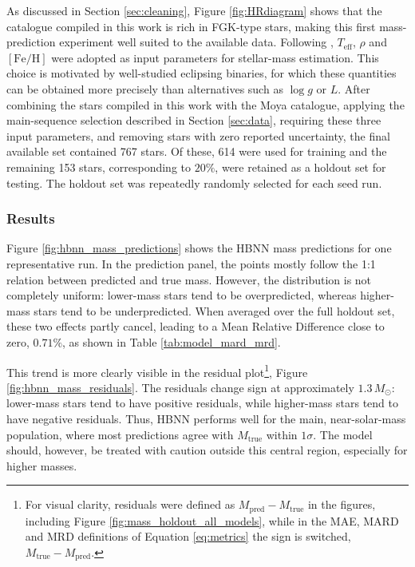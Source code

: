 As discussed in Section \ref{sec:cleaning}, Figure \ref{fig:HRdiagram} shows that the catalogue compiled in this work is rich in FGK-type stars, making this first mass-prediction experiment well suited to the available data. Following \citet{moya2018}, $T_{\mathrm{eff}}$, $\rho$ and $[\mathrm{Fe}/\mathrm{H}]$ were adopted as input parameters for stellar-mass estimation. This choice is motivated by well-studied eclipsing binaries, for which these quantities can be obtained more precisely than alternatives such as $\log g$ or $L$. After combining the stars compiled in this work with the Moya catalogue, applying the main-sequence selection described in Section \ref{sec:data}, requiring these three input parameters, and removing stars with zero reported uncertainty, the final available set contained 767 stars. Of these, 614 were used for training and the remaining 153 stars, corresponding to $20\%$, were retained as a holdout set for testing. The holdout set was repeatedly randomly selected for each seed run.

\subsubsection*{Results}

Figure \ref{fig:hbnn_mass_predictions} shows the HBNN mass predictions for one representative run. In the prediction panel, the points mostly follow the 1:1 relation between predicted and true mass. However, the distribution is not completely uniform: lower-mass stars tend to be overpredicted, whereas higher-mass stars tend to be underpredicted. When averaged over the full holdout set, these two effects partly cancel, leading to a Mean Relative Difference close to zero, $0.71\%$, as shown in Table \ref{tab:model_mard_mrd}.

This trend is more clearly visible in the residual plot\footnote{For visual clarity, residuals were defined as $M_{\mathrm{pred}}-M_{\mathrm{true}}$ in the figures, including Figure \ref{fig:mass_holdout_all_models}, while in the MAE, MARD and MRD definitions of Equation \ref{eq:metrics} the sign is switched, $M_{\mathrm{true}}-M_{\mathrm{pred}}$.}, Figure \ref{fig:hbnn_mass_residuals}. The residuals change sign at approximately $1.3\,M_\odot$: lower-mass stars tend to have positive residuals, while higher-mass stars tend to have negative residuals. Thus, HBNN performs well for the main, near-solar-mass population, where most predictions agree with $M_{\mathrm{true}}$ within $1\sigma$. The model should, however, be treated with caution outside this central region, especially for higher masses.

